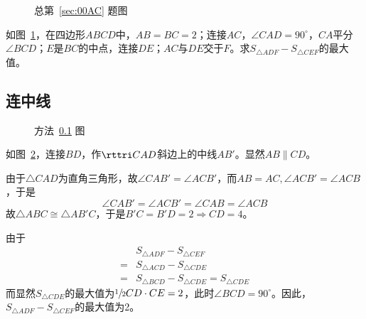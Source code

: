 

\begin{figure}[htbp]
  \centering {}
  \caption{总第~\ref{sec:00AC} 题图} \label{fig:00AC}
\end{figure}

如图~\ref{fig:00AC}，在四边形$ABCD$中，$AB = BC = 2$；连接$AC$，$\angle CAD = 90^\circ$，$CA$平分$\angle BCD$；$E$是$BC$的中点，连接$DE$；$AC$与$DE$交于$F$。求$S_{\triangle ADF} - S_{\triangle CEF}$的最大值。


\subsection{连中线} \label{subsec:00AC-mid}

\begin{figure}[htbp]
  \centering {}
  \caption{方法~\ref{subsec:00AC-mid} 图} \label{fig:00AC-mid}
\end{figure}

如图~\ref{fig:00AC-mid}，连接$BD$，作$\rttri CAD$斜边上的中线$AB'$。显然$AB \parallel CD$。

由于$\triangle CAD$为直角三角形，故$\angle CAB' = \angle ACB'$，而$AB = AC, \angle ACB' = \angle ACB$，于是
\[ \angle CAB' = \angle ACB' = \angle CAB = \angle ACB \]
故$\triangle ABC \cong \triangle AB'C$，于是$B'C = B'D = 2 \Rightarrow CD = 4$。

由于
\begin{align*}
  & S_{\triangle ADF} - S_{\triangle CEF} \\
  ={}& S_{\triangle ACD} - S_{\triangle CDE} \\
  ={}& S_{\triangle BCD} - S_{\triangle CDE} = S_{\triangle CDE}
\end{align*}
而显然$S_{\triangle CDE}$的最大值为$\sfrac12CD\cdot CE = 2$，此时$\angle BCD = 90^\circ$。因此，$S_{\triangle ADF} - S_{\triangle CEF}$的最大值为2。
